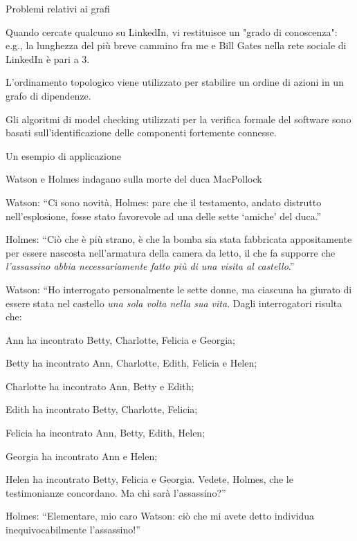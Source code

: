\begin{frame}{Problemi relativi ai grafi}

\vspace{-6pt}

\begin{myboxtitle}[Esempi]
\BIL
\item Quando cercate qualcuno su LinkedIn, vi restituisce un "grado di conoscenza": e.g., la lunghezza del più breve cammino fra me e Bill Gates nella rete sociale di LinkedIn è pari a 3.
\item L'ordinamento topologico viene utilizzato per stabilire un ordine di azioni in un grafo di dipendenze.
\item Gli algoritmi di model checking utilizzati per la verifica formale 
del software sono basati sull'identificazione delle componenti fortemente
connesse.
\EIL
\end{myboxtitle}
\end{frame}

\begin{frame}[shrink=20]{Un esempio di applicazione}

Watson e Holmes indagano sulla morte del duca MacPollock
\BIL
\item \alert{Watson}:
``Ci sono novità, Holmes: pare che il testamento,
andato distrutto nell'esplosione, fosse stato favorevole
ad una delle sette `amiche' del duca.''
\item \alert{Holmes}:
``Ciò che è
più strano, è che la bomba sia stata fabbricata
appositamente per essere nascosta nell'armatura della camera da
letto, il che fa supporre che \textit{l'assassino
abbia necessariamente fatto più di una visita al castello}.''
\item \alert{Watson}:
``Ho interrogato personalmente
le sette donne, ma ciascuna ha giurato di essere stata nel
castello \textit{una sola volta nella sua vita}.
Dagli interrogatori risulta che:
\BI
\item
Ann ha incontrato Betty, Charlotte, Felicia e Georgia;
\item
Betty ha incontrato Ann, Charlotte, Edith, Felicia e Helen;
\item
Charlotte ha incontrato Ann, Betty e Edith;
\item
Edith ha incontrato Betty, Charlotte, Felicia;
\item
Felicia ha incontrato Ann, Betty, Edith, Helen;
\item
Georgia ha incontrato Ann e Helen;
\item
Helen ha incontrato Betty, Felicia e Georgia.
\EI
Vedete, Holmes, che le testimonianze concordano. Ma chi sarà l'assassino?''
\item \alert{Holmes}:
``Elementare, mio caro Watson: ciò che mi avete detto individua
inequivocabilmente l'assassino!''
\EIL

\end{frame}

